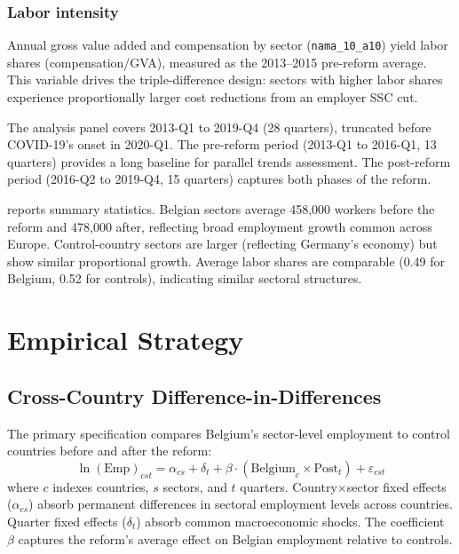 \documentclass[12pt]{article}
\begin{document}
\subsubsection*{Labor intensity} Annual gross value added and compensation by sector (\texttt{nama\_10\_a10}) yield labor shares (compensation/GVA), measured as the 2013--2015 pre-reform average. This variable drives the triple-difference design: sectors with higher labor shares experience proportionally larger cost reductions from an employer SSC cut.

The analysis panel covers 2013-Q1 to 2019-Q4 (28 quarters), truncated before COVID-19's onset in 2020-Q1. The pre-reform period (2013-Q1 to 2016-Q1, 13 quarters) provides a long baseline for parallel trends assessment. The post-reform period (2016-Q2 to 2019-Q4, 15 quarters) captures both phases of the reform.



 reports summary statistics. Belgian sectors average 458,000 workers before the reform and 478,000 after, reflecting broad employment growth common across Europe. Control-country sectors are larger (reflecting Germany's economy) but show similar proportional growth. Average labor shares are comparable (0.49 for Belgium, 0.52 for controls), indicating similar sectoral structures.

\section{Empirical Strategy} \label{sec:strategy}

\subsection{Cross-Country Difference-in-Differences}

The primary specification compares Belgium's sector-level employment to control countries before and after the reform:
\begin{equation}
\ln(\text{Emp})_{cst} = \alpha_{cs} + \delta_t + \beta \cdot (\text{Belgium}_c \times \text{Post}_t) + \varepsilon_{cst} \label{eq:did}
\end{equation}
where $c$ indexes countries, $s$ sectors, and $t$ quarters. Country$\times$sector fixed effects ($\alpha_{cs}$) absorb permanent differences in sectoral employment levels across countries. Quarter fixed effects ($\delta_t$) absorb common macroeconomic shocks. The coefficient $\beta$ captures the reform's average effect on Belgian employment relative to controls.
\end{document}
